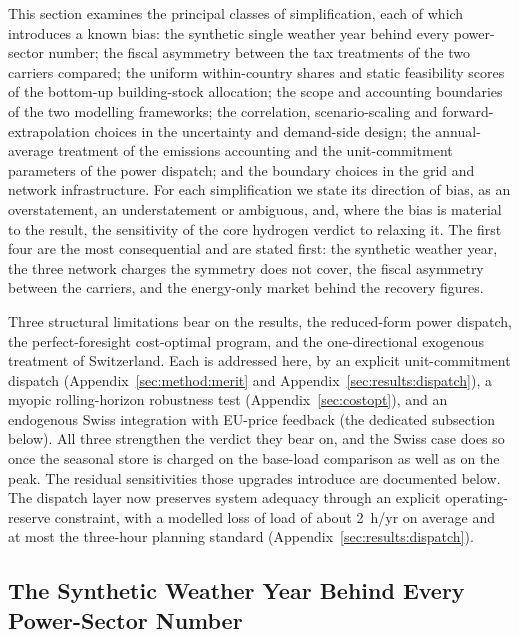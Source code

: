 \label{sec:limitations}

This section examines the principal classes of simplification, each of which introduces
a known bias: the synthetic single weather year behind every power-sector number; the
fiscal asymmetry between the tax treatments of the two carriers compared; the uniform within-country shares and static feasibility scores of the
bottom-up building-stock allocation; the scope and accounting boundaries of the two
modelling frameworks; the correlation, scenario-scaling and forward-extrapolation
choices in the uncertainty and demand-side design; the annual-average treatment of the
emissions accounting and the unit-commitment parameters of the power dispatch; and the
boundary choices in the grid and network infrastructure. For each simplification we
state its direction of bias, as an overstatement, an understatement or ambiguous, and,
where the bias is material to the result, the sensitivity of the core hydrogen verdict
to relaxing it. The first four are the most consequential and are stated first: the synthetic weather
year, the three network charges the symmetry does not cover, the fiscal asymmetry between
the carriers, and the energy-only market behind the recovery figures.

Three structural limitations bear on the results, the reduced-form power
dispatch, the perfect-foresight cost-optimal program, and the one-directional exogenous
treatment of Switzerland. Each is addressed here, by an explicit
unit-commitment dispatch (Appendix~\ref{sec:method:merit} and
Appendix~\ref{sec:results:dispatch}), a myopic rolling-horizon robustness test
(Appendix~\ref{sec:costopt}), and an endogenous Swiss integration with EU-price feedback
(the dedicated subsection below). All three strengthen the verdict they bear on, and the
Swiss case does so once the seasonal store is charged on the base-load comparison as well as on the peak. The
residual sensitivities those upgrades introduce are documented below. The
dispatch layer now preserves system adequacy through an explicit operating-reserve
constraint, with a modelled loss of load of about 2~h/yr on average and at most the
three-hour planning standard (Appendix~\ref{sec:results:dispatch}).

\subsection{The Synthetic Weather Year Behind Every Power-Sector Number}

